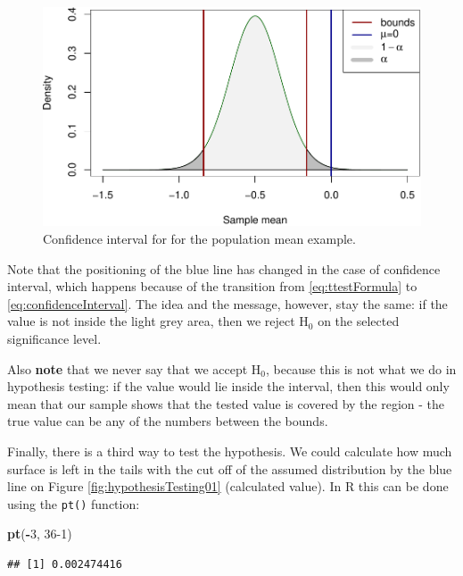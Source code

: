 \documentclass[
]{book}
\newenvironment{Shaded}{\begin{snugshade}}{\end{snugshade}}
\newcommand{\DecValTok}[1]{\textcolor[rgb]{0.00,0.00,0.81}{#1}}
\newcommand{\KeywordTok}[1]{\textcolor[rgb]{0.13,0.29,0.53}{\textbf{#1}}}
\newcommand{\NormalTok}[1]{#1}
\newcommand{\OperatorTok}[1]{\textcolor[rgb]{0.81,0.36,0.00}{\textbf{#1}}}
\theoremstyle{definition}
\theoremstyle{definition}
\theoremstyle{definition}
\theoremstyle{definition}
\theoremstyle{remark}
\begin{document}
\begin{figure}
\centering
\includegraphics{Svetunkov---Statistics-for-Business-Analytics_files/figure-latex/hypothesisTesting02-1.pdf}
\caption{\label{fig:hypothesisTesting02}Confidence interval for for the population mean example.}
\end{figure}

Note that the positioning of the blue line has changed in the case of confidence interval, which happens because of the transition from \eqref{eq:ttestFormula} to \eqref{eq:confidenceInterval}. The idea and the message, however, stay the same: if the value is not inside the light grey area, then we reject \(\mathrm{H}_0\) on the selected significance level.

Also \textbf{note} that we never say that we accept \(\mathrm{H}_0\), because this is not what we do in hypothesis testing: if the value would lie inside the interval, then this would only mean that our sample shows that the tested value is covered by the region - the true value can be any of the numbers between the bounds.

Finally, there is a third way to test the hypothesis. We could calculate how much surface is left in the tails with the cut off of the assumed distribution by the blue line on Figure \ref{fig:hypothesisTesting01} (calculated value). In R this can be done using the \texttt{pt()} function:

\begin{Shaded}
\begin{Highlighting}[]
\KeywordTok{pt}\NormalTok{(}\OperatorTok{{-}}\DecValTok{3}\NormalTok{, }\DecValTok{36{-}1}\NormalTok{)}
\end{Highlighting}
\end{Shaded}

\begin{verbatim}
## [1] 0.002474416
\end{verbatim}
\end{document}

